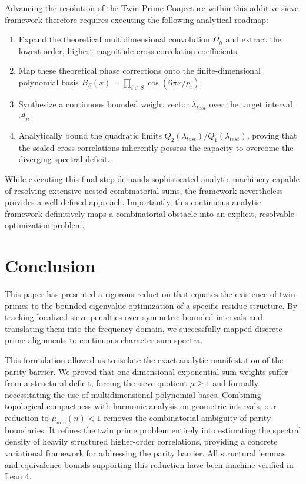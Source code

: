 \documentclass{ws-ijnt}
\begin{document}
Advancing the resolution of the Twin Prime Conjecture within this additive sieve framework therefore
requires executing the following analytical roadmap:
\begin{enumerate}
    \item Expand the theoretical multidimensional convolution $\Omega_h$ and extract the lowest-order,
highest-magnitude cross-correlation coefficients.
    \item Map these theoretical phase corrections onto the finite-dimensional polynomial basis
    $B_S(x) = \prod_{i \in S} \cos(6\pi x/p_i)$.
    \item Synthesize a continuous bounded weight vector $\lambda_{test}$ over the target interval
    $\mathcal{A}_n$.
    \item Analytically bound the quadratic limits $Q_2(\lambda_{test}) / Q_1(\lambda_{test})$, proving
    that the scaled cross-correlations inherently possess the capacity to overcome the diverging
    spectral deficit.
\end{enumerate}

While executing this final step demands sophisticated analytic machinery capable of resolving
extensive nested combinatorial sums, the framework nevertheless provides a well-defined approach.
Importantly, this continuous analytic framework definitively maps a combinatorial obstacle into an
explicit, resolvable optimization problem.

\section{Conclusion} \label{sec:conclusion}

This paper has presented a rigorous reduction that equates the existence of twin primes to
the bounded eigenvalue optimization of a specific residue structure. By tracking localized sieve penalties
over symmetric bounded intervals and translating them into the frequency domain, we successfully
mapped discrete prime alignments to continuous character sum spectra. 

This formulation allowed us to isolate the exact analytic manifestation of the
parity barrier. We proved that one-dimensional exponential sum weights suffer from a structural deficit,
forcing the sieve quotient $\mu \ge 1$ and formally necessitating the use of multidimensional
polynomial bases. Combining topological compactness with harmonic analysis on geometric intervals,
our reduction to $\mu_{\min}(n) < 1$ removes the combinatorial ambiguity of parity boundaries. It
refines the twin prime problem entirely into estimating the spectral density of heavily structured
higher-order correlations, providing a concrete variational framework for addressing
the parity barrier. All structural lemmas and equivalence bounds supporting this reduction have been
machine-verified in Lean 4.
\end{document}
